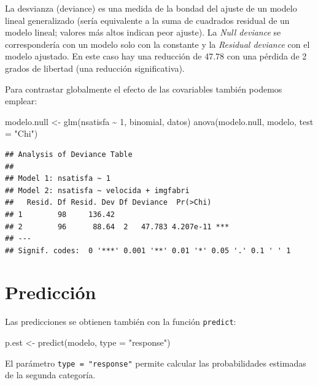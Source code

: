 \documentclass[
]{book}
\newenvironment{Shaded}{\begin{snugshade}}{\end{snugshade}}
\newcommand{\AttributeTok}[1]{\textcolor[rgb]{0.77,0.63,0.00}{#1}}
\newcommand{\DecValTok}[1]{\textcolor[rgb]{0.00,0.00,0.81}{#1}}
\newcommand{\FunctionTok}[1]{\textcolor[rgb]{0.00,0.00,0.00}{#1}}
\newcommand{\NormalTok}[1]{#1}
\newcommand{\OtherTok}[1]{\textcolor[rgb]{0.56,0.35,0.01}{#1}}
\newcommand{\SpecialCharTok}[1]{\textcolor[rgb]{0.00,0.00,0.00}{#1}}
\newcommand{\StringTok}[1]{\textcolor[rgb]{0.31,0.60,0.02}{#1}}
\theoremstyle{break}
\theoremstyle{nonumberplain}
\begin{document}
La desvianza (deviance) es una medida de la bondad del ajuste de un modelo lineal generalizado (sería equivalente a la suma de cuadrados residual de un modelo lineal; valores más altos indican peor ajuste). La \emph{Null deviance} se correspondería con un modelo solo con la constante y la \emph{Residual deviance} con el modelo ajustado.
En este caso hay una reducción de 47.78 con una pérdida de 2 grados de libertad (una reducción significativa).

Para contrastar globalmente el efecto de las covariables también podemos emplear:

\begin{Shaded}
\begin{Highlighting}[]
\NormalTok{modelo.null }\OtherTok{\textless{}{-}} \FunctionTok{glm}\NormalTok{(nsatisfa }\SpecialCharTok{\textasciitilde{}} \DecValTok{1}\NormalTok{, binomial, datos)}
\FunctionTok{anova}\NormalTok{(modelo.null, modelo, }\AttributeTok{test =} \StringTok{"Chi"}\NormalTok{)}
\end{Highlighting}
\end{Shaded}

\begin{verbatim}
## Analysis of Deviance Table
## 
## Model 1: nsatisfa ~ 1
## Model 2: nsatisfa ~ velocida + imgfabri
##   Resid. Df Resid. Dev Df Deviance  Pr(>Chi)    
## 1        98     136.42                          
## 2        96      88.64  2   47.783 4.207e-11 ***
## ---
## Signif. codes:  0 '***' 0.001 '**' 0.01 '*' 0.05 '.' 0.1 ' ' 1
\end{verbatim}

\hypertarget{predicciuxf3n-1}{%
\section{Predicción}\label{predicciuxf3n-1}}

Las predicciones se obtienen también con la función \texttt{predict}:

\begin{Shaded}
\begin{Highlighting}[]
\NormalTok{p.est }\OtherTok{\textless{}{-}} \FunctionTok{predict}\NormalTok{(modelo, }\AttributeTok{type =} \StringTok{"response"}\NormalTok{)}
\end{Highlighting}
\end{Shaded}

El parámetro \texttt{type\ =\ "response"} permite calcular las probabilidades estimadas de la segunda categoría.
\end{document}
